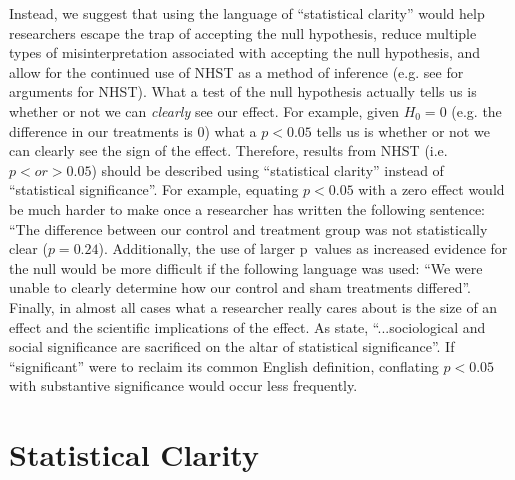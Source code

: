 Instead, we suggest that using the language of ``statistical clarity'' would help researchers escape the trap of accepting 
the null hypothesis, reduce multiple types of misinterpretation associated with accepting the null hypothesis, and allow for
the continued use of NHST as a method of inference (e.g. see \citealt{Abelson1997} for arguments for NHST). What a test of the
null hypothesis actually tells us is whether or not we can \emph{clearly} see our effect. For example, given $H_{0} = 0$ (e.g.
the difference in our treatments is 0) what a $p < 0.05$ tells us is whether or not we can clearly see the sign of the effect. 
Therefore, results from NHST (i.e. $p < or > 0.05$) should be described using ``statistical clarity'' instead of ``statistical 
significance''. For example, equating $p < 0.05$ with a zero effect would be much harder to make once a researcher has written 
the following sentence: ``The difference between our control and treatment group was not statistically clear ($p = 0.24$). 
Additionally, the use of larger p~values as increased evidence for the null would be more difficult if the following language
was used: ``We were unable to clearly determine how our control and sham treatments differed''. Finally, in almost all cases 
what a researcher really cares about is the size of an effect and the scientific implications of the effect.  As 
\citet{Bernardietal.2017} state, ``...sociological and social significance are sacrificed on the altar of statistical 
significance''. If ``significant'' were to reclaim its common English definition, conflating $p < 0.05$ with substantive
significance would occur less frequently.

\section*{Statistical Clarity}


